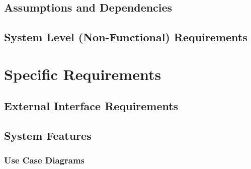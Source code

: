 \documentclass[12pt, oneside, letterpaper]{report}
\begin{document}
	\section{Assumptions and Dependencies}
		
	\section{System Level (Non-Functional) Requirements}
		
\chapter{Specific Requirements}
	\section{External Interface Requirements}
		


	\section{System Features}
		\subsection{Use Case Diagrams}

\end{document}
